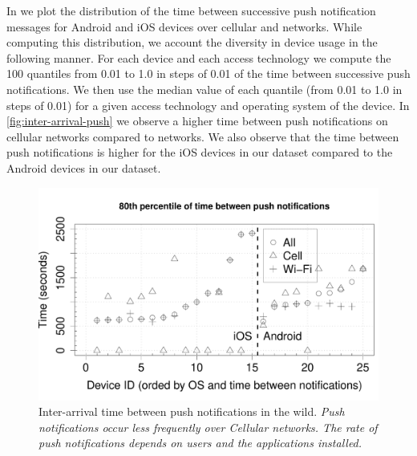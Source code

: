 In  we plot the distribution of the time between successive push notification messages for Android and iOS devices over cellular and \wifi networks. 
While computing this distribution, we account the diversity in device usage in the following manner.
For each device and each access technology we compute the 100 quantiles from 0.01 to 1.0 in steps of 0.01 of the time between successive push notifications. 
We then use the median value of each quantile (from 0.01 to 1.0 in steps of 0.01) for a given access technology and operating system of the device.
In \ref{fig:inter-arrival-push} we observe a higher time between push notifications on cellular networks compared to \wifi networks. 
We also observe that the time between push notifications is higher for the iOS devices in our dataset compared to the Android devices in our dataset. 

\begin{figure}
\includegraphics[width=\columnwidth]{plots/push_inter_arrival_wild.pdf}
\caption{Inter-arrival time between push notifications in the wild. \emph{Push notifications occur less frequently over Cellular networks. The rate of push notifications depends on users and the applications installed. }}
\label{fig:wild-inter-arrival-push}
\end{figure}


